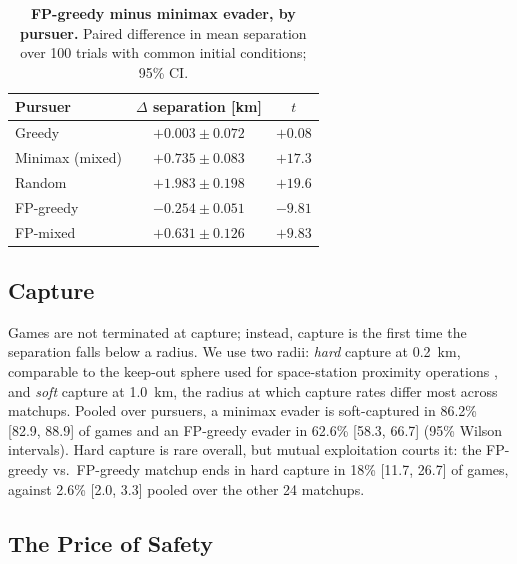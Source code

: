 \documentclass[letterpaper, 10 pt, conference]{ieeeconf}  %
\begin{document}
\begin{table}[!t]
\centering
\caption{\textbf{FP-greedy minus minimax evader, by pursuer.} Paired difference in mean separation over 100 trials with common initial conditions; 95\% CI.}
\begin{tabular}{lcc}
\toprule
Pursuer & $\Delta$ separation [km] & $t$ \\
\midrule
Greedy    & $+0.003 \pm 0.072$ & $+0.08$ \\
Minimax (mixed) & $+0.735 \pm 0.083$ & $+17.3$ \\
Random    & $+1.983 \pm 0.198$ & $+19.6$ \\
FP-greedy & $\mathbf{-0.254 \pm 0.051}$ & $\mathbf{-9.81}$ \\
FP-mixed  & $+0.631 \pm 0.126$ & $+9.83$ \\
\bottomrule
\end{tabular}
\label{tab:contrast}
\end{table}

\subsection{Capture}

Games are not terminated at capture; instead, capture is the first time the separation falls below a radius. We use two radii: \emph{hard} capture at 0.2~km, comparable to the keep-out sphere used for space-station proximity operations \red{[cite]}, and \emph{soft} capture at 1.0~km, the radius at which capture rates differ most across matchups. Pooled over pursuers, a minimax evader is soft-captured in 86.2\% [82.9, 88.9] of games and an FP-greedy evader in 62.6\% [58.3, 66.7] (95\% Wilson intervals). Hard capture is rare overall, but mutual exploitation courts it: the FP-greedy vs.\ FP-greedy matchup ends in hard capture in 18\% [11.7, 26.7] of games, against 2.6\% [2.0, 3.3] pooled over the other 24 matchups.

\subsection{The Price of Safety}
\label{sec:pos}
\end{document}
